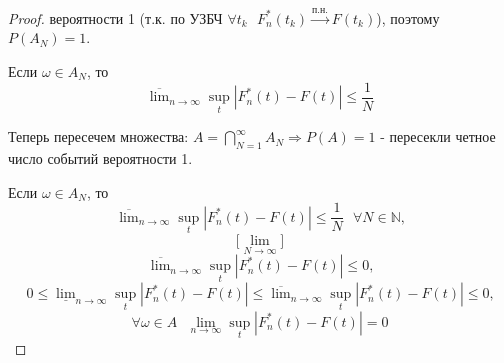 \begin{proof}
    вероятности 1 (т.к. по УЗБЧ $\forall t_k \textrm{ } F_{n}^{*}(t_k) \xrightarrow{\textrm{п.н.}} F(t_k)$), поэтому $P(A_N) = 1$.
    
    Если $\omega \in A_N$, то
    $$\overline{\lim}_{n \to \infty} \sup_{t}|F_{n}^{*}(t) - F(t)| \leq \frac{1}{N}$$
    
    Теперь пересечем множества: $A = \bigcap_{N = 1}^{\infty}A_N \Rightarrow P(A) = 1$ - пересекли четное число событий вероятности 1.
    
    Если $\omega \in A_N$, то
    $$\overline{\lim}_{n \to \infty} \sup_{t}|F_{n}^{*}(t) - F(t)| \leq \frac{1}{N} \textrm{ } \forall N \in \mathbb{N} \textrm{,}$$
    $$\Big[ \lim_{N \to \infty} \Big]$$
    $$\overline{\lim}_{n \to \infty} \sup_{t}|F_{n}^{*}(t) - F(t)| \leq 0 \textrm{,}$$
    $$0 \leq \underline{\lim}_{n \to \infty} \sup_{t}|F_{n}^{*}(t) - F(t)| \leq \overline{\lim}_{n \to \infty} \sup_{t}|F_{n}^{*}(t) - F(t)| \leq 0 \textrm{,}$$
    $$\forall \omega \in A \textrm{ } \lim_{n \to \infty} \sup_{t}|F_{n}^{*}(t) - F(t)| = 0$$
\end{proof}
